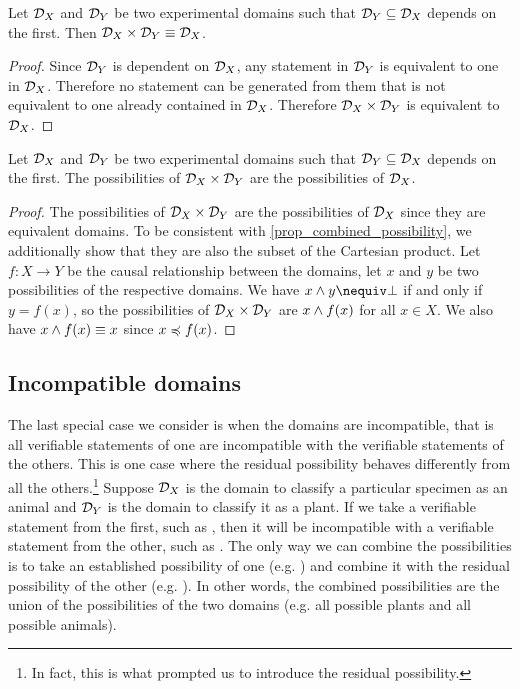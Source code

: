 \documentclass[11pt,letterpaper,fleqn]{memoir} %
\begin{document}
\begin{mathSection}
	\begin{prop}
		Let $\mathcal{D}_X$ and $\mathcal{D}_Y$ be two experimental domains such that $\mathcal{D}_Y \subseteq \mathcal{D}_X$ depends on the first. Then $\mathcal{D}_X \times \mathcal{D}_Y \equiv \mathcal{D}_X$.
	\end{prop}
	\begin{proof}
		Since $\mathcal{D}_Y$ is dependent on $\mathcal{D}_X$, any statement in $\mathcal{D}_Y$ is equivalent to one in $\mathcal{D}_X$. Therefore no statement can be generated from them that is not equivalent to one already contained in $\mathcal{D}_X$. Therefore $\mathcal{D}_X \times \mathcal{D}_Y$ is equivalent to $\mathcal{D}_X$. 
	\end{proof}
	\begin{coro}
		Let $\mathcal{D}_X$ and $\mathcal{D}_Y$ be two experimental domains such that $\mathcal{D}_Y \subseteq \mathcal{D}_X$ depends on the first. The possibilities of $\mathcal{D}_X \times \mathcal{D}_Y$ are the possibilities of $\mathcal{D}_X$.
	\end{coro}
	\begin{proof}
		The possibilities of $\mathcal{D}_X \times \mathcal{D}_Y$ are the possibilities of $\mathcal{D}_X$ since they are equivalent domains. To be consistent with \ref{prop_combined_possibility}, we additionally show that they are also the subset of the Cartesian product. Let $f : X \to Y$ be the causal relationship between the domains, let $x$ and $y$ be two possibilities of the respective domains. We have $x \AND y \nequiv \impossibility$ if and only if $y = f(x)$, so the possibilities of $\mathcal{D}_X \times \mathcal{D}_Y$ are $x \wedge f(x)$ for all $x \in X$. We also have $x \wedge f(x) \equiv x$ since $x \preccurlyeq f(x)$.
	\end{proof}
\end{mathSection}


\subsection{Incompatible domains}

The last special case we consider is when the domains are incompatible, that is all verifiable statements of one are incompatible with the verifiable statements of the others. This is one case where the residual possibility behaves differently from all the others.\footnote{In fact, this is what prompted us to introduce the residual possibility.} Suppose $\mathcal{D}_X$ is the domain to classify a particular specimen as an animal and $\mathcal{D}_Y$ is the domain to classify it as a plant. If we take a verifiable statement from the first, such as , then it will be incompatible with a verifiable statement from the other, such as . The only way we can combine the possibilities is to take an established possibility of one (e.g. ) and combine it with the residual possibility of the other (e.g. ). In other words, the combined possibilities are the union of the possibilities of the two domains (e.g. all possible plants and all possible animals).
\end{document}
